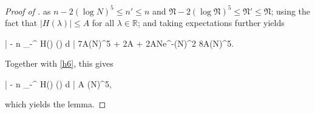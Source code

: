 \documentclass{amsart}
\numberwithin{equation}{section}
\DeclareMathOperator{\eig}{eig}
\theoremstyle{remark}
\theoremstyle{definition}
\begin{document}
\begin{proof}[Proof of ]
		\noindent as $n - 2(\log N)^5 \le n' \le n$ and $\mathfrak{N} - 2 (\log \mathfrak{N})^5 \le \mathfrak{N}' \le \mathfrak{N}$; using the fact that $| H(\lambda) | \le A$ for all $\lambda \in \mathbb{R}$; and taking expectations further yields 
		\begin{flalign*} 
			\Bigg|  \bigg[ \displaystyle\frac{1}{\mathfrak{K}} \displaystyle\sum_{\nu \in \eig \bm{\mathfrak{L}}} H(\nu) \bigg] - n \displaystyle\int_{-\infty}^{\infty} H(\lambda) \varrho(\lambda) d \lambda \Bigg| \le 7A(\log N)^5 + 2A + 2ANe^{-(\log N)^2} \le 8A(\log N)^5.
		\end{flalign*} 
		
		\noindent Together with \eqref{h6}, this gives 
		\begin{flalign*}
			\Bigg|  \bigg[ \displaystyle\sum_{i = n_1}^{n_2} H(\Lambda_i) \bigg] - n \displaystyle\int_{-\infty}^{\infty} H(\lambda) \varrho(\lambda) d \lambda \Bigg|  A (\log N)^5,
		\end{flalign*}
		
		\noindent which yields the lemma.
	\end{proof}
	
\end{document}
